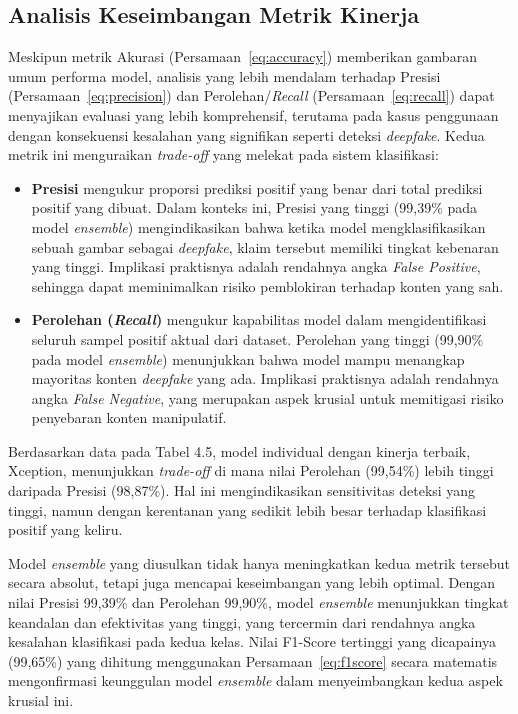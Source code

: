 \subsection{Analisis Keseimbangan Metrik Kinerja}

Meskipun metrik Akurasi (Persamaan~\ref{eq:accuracy}) memberikan gambaran umum performa model, analisis yang lebih mendalam terhadap Presisi (Persamaan~\ref{eq:precision}) dan Perolehan/\textit{Recall} (Persamaan~\ref{eq:recall}) dapat menyajikan evaluasi yang lebih komprehensif, terutama pada kasus penggunaan dengan konsekuensi kesalahan yang signifikan seperti deteksi \textit{deepfake}. Kedua metrik ini menguraikan \textit{trade-off} yang melekat pada sistem klasifikasi:

\begin{itemize}
    \item \textbf{Presisi} mengukur proporsi prediksi positif yang benar dari total prediksi positif yang dibuat. Dalam konteks ini, Presisi yang tinggi (99,39\% pada model \textit{ensemble}) mengindikasikan bahwa ketika model mengklasifikasikan sebuah gambar sebagai \textit{deepfake}, klaim tersebut memiliki tingkat kebenaran yang tinggi. Implikasi praktisnya adalah rendahnya angka \textit{False Positive}, sehingga dapat meminimalkan risiko pemblokiran terhadap konten yang sah.

    \item \textbf{Perolehan (\textit{Recall})} mengukur kapabilitas model dalam mengidentifikasi seluruh sampel positif aktual dari dataset. Perolehan yang tinggi (99,90\% pada model \textit{ensemble}) menunjukkan bahwa model mampu menangkap mayoritas konten \textit{deepfake} yang ada. Implikasi praktisnya adalah rendahnya angka \textit{False Negative}, yang merupakan aspek krusial untuk memitigasi risiko penyebaran konten manipulatif.
\end{itemize}

Berdasarkan data pada Tabel 4.5, model individual dengan kinerja terbaik, Xception, menunjukkan \textit{trade-off} di mana nilai Perolehan (99,54\%) lebih tinggi daripada Presisi (98,87\%). Hal ini mengindikasikan sensitivitas deteksi yang tinggi, namun dengan kerentanan yang sedikit lebih besar terhadap klasifikasi positif yang keliru.

Model \textit{ensemble} yang diusulkan tidak hanya meningkatkan kedua metrik tersebut secara absolut, tetapi juga mencapai keseimbangan yang lebih optimal. Dengan nilai Presisi 99,39\% dan Perolehan 99,90\%, model \textit{ensemble} menunjukkan tingkat keandalan dan efektivitas yang tinggi, yang tercermin dari rendahnya angka kesalahan klasifikasi pada kedua kelas. Nilai F1-Score tertinggi yang dicapainya (99,65\%) yang dihitung menggunakan Persamaan~\ref{eq:f1score} secara matematis mengonfirmasi keunggulan model \textit{ensemble} dalam menyeimbangkan kedua aspek krusial ini.

